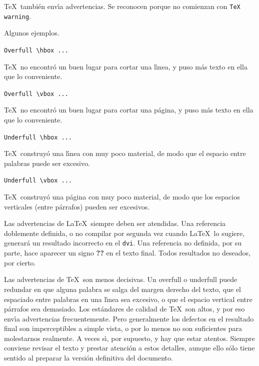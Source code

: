 \TeX\ tambi{\'e}n env\'{\i}a advertencias. Se reconocen porque no
comienzan con \verb+TeX warning+. 

Algunos ejemplos.

\begin{list}{}{\setlength{\leftmargin}{0pt}}
\item \verb+Overfull \hbox ...+

\TeX\ no encontr{\'o} un buen lugar para cortar una l\'{\i}nea, y puso
m{\'a}s texto en ella que lo conveniente.

\item \verb+Overfull \vbox ...+

\TeX\ no encontr{\'o} un buen lugar para cortar una p{\'a}gina, y puso
m{\'a}s texto en ella que lo conveniente.

\item \verb+Underfull \hbox ...+

\TeX\ construy{\'o} una l\'{\i}nea con muy poco material, de modo que
el espacio entre palabras puede ser excesivo.

\item \verb+Underfull \vbox ...+

\TeX\ construy{\'o} una p{\'a}gina con muy poco material, de modo que los
espacios verticales (entre p{\'a}rrafos) pueden ser excesivos.
\end{list}


Las advertencias de \LaTeX\ siempre deben ser atendidas. Una
referencia doblemente definida, o no compilar por segunda vez cuando
\LaTeX\ lo sugiere, generar{\'a} un resultado incorrecto en el
\verb+dvi+. Una referencia no definida, por su parte, hace aparecer
un signo {\bf ??} en el texto final. Todos resultados no deseados, por
cierto. 

Las advertencias de \TeX\ son menos decisivas. Un overfull o
underfull puede redundar en que alguna palabra se salga del margen
derecho del texto, que el espaciado entre palabras en una l\'{\i}nea
sea excesivo, o que el espacio vertical entre p{\'a}rrafos sea
demasiado. Los est{\'a}ndares de calidad de \TeX\ son altos, y por eso
env\'{\i}a advertencias frecuentemente. Pero generalmente los
defectos en el resultado final son imperceptibles a simple vista, o
por lo menos no son suficientes para molestarnos realmente. A veces
s\'{\i}, por supuesto, y hay que estar atentos. Siempre conviene
revisar el texto y prestar atenci{\'o}n a estos detalles, aunque ello
s{\'o}lo tiene sentido al preparar la versi{\'o}n definitiva del
documento. 




